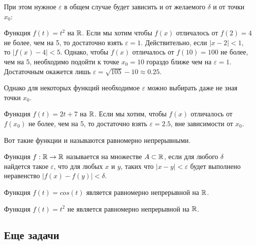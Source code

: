 {При этом нужное $\varepsilon$ в общем случае будет зависить и от желаемого $\delta$ и от точки $x_{0}$:

\begin{myex}
Функция $f(t)=t^{2}$ на $\mathbb{R}$. Если мы хотим чтобы $f(x)$ отличалось от $f(2)=4$ не более, чем на 5, то достаточно взять $\varepsilon=1$. Действительно, если $|x-2|<1$, то $|f(x)-4|<5$. Однако, чтобы $f(x)$ отличалось от $f(10)=100$ не более, чем на 5, необходимо подойти к точке $x_{0}=10$ гораздо ближе чем на $\varepsilon=1$. Достаточным окажется лишь $\varepsilon=\sqrt{105}-10\approx 0.25$.
\end{myex}

Однако для некоторых функций необходимое $\varepsilon$ можно выбирать даже не зная точки $x_{0}$.

\begin{myex}
Функция $f(t)=2t+7$ на $\mathbb{R}$. Если мы хотим, чтобы $f(x)$ отличалось от $f(x_{0})$ не более, чем на 5, то достаточно взять $\varepsilon=2.5$, вне зависимости от $x_{0}$.
\end{myex}

Вот такие функции и называются равномерно непрерывными.
\begin{mydef}
Функция $f:\mathbb{R}\to\mathbb{R}$ называется  на множестве $A\subset \mathbb{R}$, если для любого $\delta$ найдется такое $\varepsilon$, что для любых $x$ и $y$, таких что $|x-y|<\varepsilon$ будет выполнено неравенство $|f(x)-f(y)|<\delta$. 
\end{mydef}

\begin{myex}
Функция $f(t)=cos(t)$ является равномерно непрерывной на $\mathbb{R}$.
\end{myex}

\begin{myex}
Функция $f(t)=t^{2}$ не является равномерно непрерывной на $\mathbb{R}$.
\end{myex}




}\subsection{Еще задачи}



\solution{}


